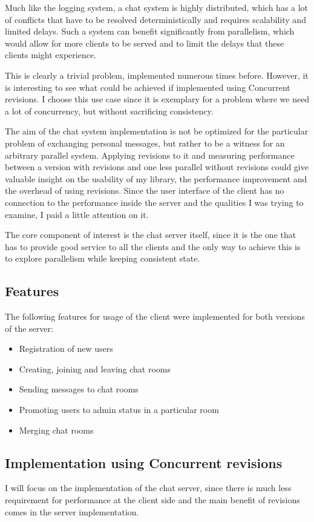 \documentclass[12pt,twoside,notitlepage]{report}
\begin{document}
Much like the logging system, a chat system is highly distributed, which has a lot of conflicts that have to be resolved deterministically and requires scalability and limited delays. Such a system can benefit significantly from parallelism, which would allow for more clients to be served and to limit the delays that these clients might experience.

This is clearly a trivial problem, implemented numerous times before. However, it is interesting to see what could be achieved if implemented using Concurrent revisions. I choose this use case since it is exemplary for a problem where we need a lot of concurrency, but without sacrificing consistency. 

The aim of the chat system implementation is not be optimized for the particular problem of exchanging personal messages, but rather to be a witness for an arbitrary parallel system. Applying revisions to it and measuring performance between a version with revisions and one less parallel without revisions could give valuable insight on the usability of my library, the performance improvement and the overhead of using revisions. Since the user interface of the client has no connection to the performance inside the server and the qualities I was trying to examine, I paid a little attention on it.   

The core component of interest is the chat server itself, since it is the one that has to provide good service to all the clients and the only way to achieve this is to explore parallelism while keeping consistent state.

\subsection{Features}
The following features for usage of the client were implemented for both versions of the server:
\begin{itemize}
\item
Registration of new users
\item
Creating, joining and leaving chat rooms
\item 
Sending messages to chat rooms
\item
Promoting users to admin status in a particular room
\item
Merging chat rooms
\end{itemize}
  
\subsection{Implementation using Concurrent revisions}
I will focus on the implementation of the chat server, since there is much less requirement for performance at the client side and the main benefit of revisions comes in the server implementation.
\end{document}
